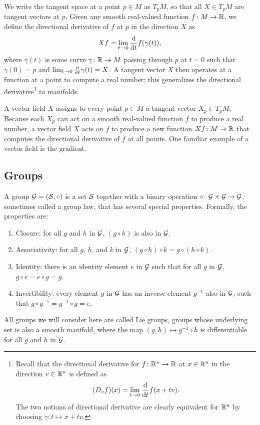 \documentclass[../../main.tex]{subfiles}
\begin{document}
\begin{refsection}
	We write the tangent space at a point $p \in M$ as $T_p M$, so that all $X \in T_p M$ are tangent vectors at $p$.
	Given any smooth real-valued function $f \colon M \to \mathbb{R}$, we define the directional derivative of $f$ at $p$ in the direction $X$ as
	$$X f = \lim_{t \to 0} \dv{t} f(\gamma(t)),$$
	where $\gamma(t)$ is some curve $\gamma \colon \mathbb{R} \to M$ passing through $p$ at $t = 0$ such that $\gamma(0) = p$ and $\lim_{t \to 0} \dv{t} \gamma(t) = X$.
	A tangent vector $X$ then operates at a function at a point to compute a real number;
	this generalizes the directional derivative\footnote{Recall that the directional derivative for $f \colon \mathbb{R}^n \to \mathbb{R}$ at $x \in \mathbb{R}^n$ in the direction $v \in \mathbb{R}^n$ is defined as
		$$\qty(D_v f)(x) = \lim_{t \to 0} \dv{t} f(x + t v).$$
		The two notions of directional derivative are clearly equivalent for $\mathbb{R}^n$ by choosing $\gamma: t \mapsto x + tv$.} to manifolds.

	A vector field $X$ assigns to every point $p \in M$ a tangent vector $X_p \in T_p M$.
	Because each $X_p$ can act on a smooth real-valued function $f$ to produce a real number, a vector field $X$ acts on $f$ to produce a new function $Xf \colon M \to \mathbb{R}$ that computes the directional derivative of $f$ at all points.
	One familiar example of a vector field is the gradient.

	\subsection{Groups}\label{groups}

	A group $\mathcal{G} = (\mathcal{S}, \circ)$ is a set $\mathcal{S}$ together with a binary operation $\circ \colon \mathcal{G} \times \mathcal{G} \to \mathcal{G}$, sometimes called a group law, that has several special properties.
	Formally, the properties are:
	\begin{enumerate}
		\def\labelenumi{\arabic{enumi}.}
		\item
		      Closure: for all $g$ and $h$ in $\mathcal{G}$, $(g \circ h)$ is also in $\mathcal{G}$.
		\item
		      Associativity: for all $g$, $h$, and $k$ in $\mathcal{G}$, $(g \circ h) \circ k = g \circ (h \circ k)$.
		\item
		      Identity: there is an identity element $e$ in $\mathcal{G}$ such that for all $g$ in $\mathcal{G}$,  $g \circ e = e \circ g = g$.
		\item
		      Invertibility: every element $g$ in $\mathcal{G}$ has an inverse element $g^{-1}$ also in $\mathcal{G}$, such that $g \circ g^{-1} = g^{-1} \circ g = e$.
	\end{enumerate}
	All groups we will consider here are called Lie groups, groups whose underlying set is also a smooth manifold, where the map $(g, h) \mapsto g^{-1} \circ h$ is differentiable for all $g$ and $h$ in $\mathcal{G}$.


\end{refsection}
\end{document}
